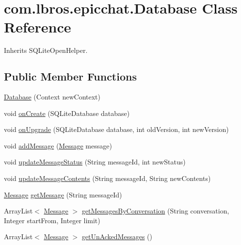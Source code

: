 \hypertarget{classcom_1_1lbros_1_1epicchat_1_1_database}{\section{com.\-lbros.\-epicchat.\-Database Class Reference}
\label{classcom_1_1lbros_1_1epicchat_1_1_database}
}


Inherits S\-Q\-Lite\-Open\-Helper.

\subsection*{Public Member Functions}
\begin{DoxyCompactItemize}
\item 
\hyperlink{classcom_1_1lbros_1_1epicchat_1_1_database_a23f9bfb1ecfa5ffa6f05b935aa510aee}{Database} (Context new\-Context)
\item 
void \hyperlink{classcom_1_1lbros_1_1epicchat_1_1_database_aeb50e7b935a7c12f65b2cdead3e7b8a5}{on\-Create} (S\-Q\-Lite\-Database database)
\item 
void \hyperlink{classcom_1_1lbros_1_1epicchat_1_1_database_aacce6e202944051d5881ab39357cd702}{on\-Upgrade} (S\-Q\-Lite\-Database database, int old\-Version, int new\-Version)
\item 
void \hyperlink{classcom_1_1lbros_1_1epicchat_1_1_database_a7cec8a7baf9ad78d4369b6aa74693e71}{add\-Message} (\hyperlink{classcom_1_1lbros_1_1epicchat_1_1_message}{Message} message)
\item 
void \hyperlink{classcom_1_1lbros_1_1epicchat_1_1_database_a2538b44d288a382d6a68a048435d214c}{update\-Message\-Status} (String message\-Id, int new\-Status)
\item 
void \hyperlink{classcom_1_1lbros_1_1epicchat_1_1_database_ab0c37889bac45168867650ab9e8b2c45}{update\-Message\-Contents} (String message\-Id, String new\-Contents)
\item 
\hyperlink{classcom_1_1lbros_1_1epicchat_1_1_message}{Message} \hyperlink{classcom_1_1lbros_1_1epicchat_1_1_database_a74ca149bfbefa14e408dccd9d0671fc6}{get\-Message} (String message\-Id)
\item 
Array\-List$<$ \hyperlink{classcom_1_1lbros_1_1epicchat_1_1_message}{Message} $>$ \hyperlink{classcom_1_1lbros_1_1epicchat_1_1_database_a8e400103fcbedf22d8471a122ecb2715}{get\-Messages\-By\-Conversation} (String conversation, Integer start\-From, Integer limit)
\item 
Array\-List$<$ \hyperlink{classcom_1_1lbros_1_1epicchat_1_1_message}{Message} $>$ \hyperlink{classcom_1_1lbros_1_1epicchat_1_1_database_ace56849a58cca9cea9b0799e0f001638}{get\-Un\-Acked\-Messages} ()

\end{DoxyCompactItemize}
